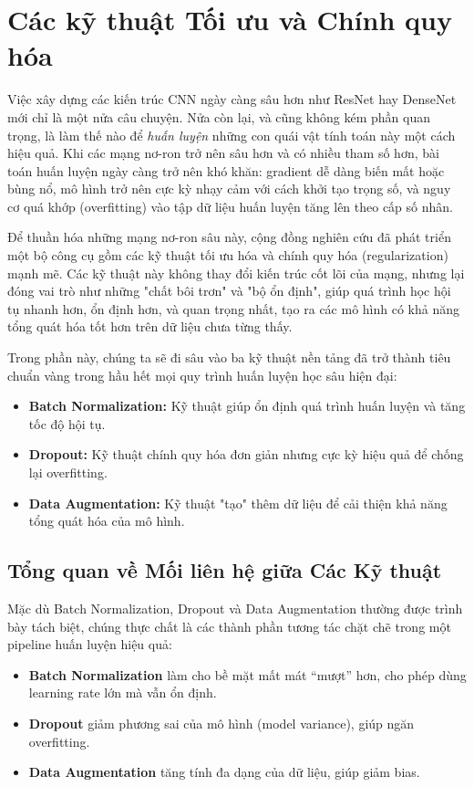 \section{Các kỹ thuật Tối ưu và Chính quy hóa}
\label{sec:optimization_regularization_techniques}

Việc xây dựng các kiến trúc CNN ngày càng sâu hơn như ResNet hay DenseNet mới chỉ là một nửa câu chuyện. Nửa còn lại, và cũng không kém phần quan trọng, là làm thế nào để \textit{huấn luyện} những con quái vật tính toán này một cách hiệu quả. Khi các mạng nơ-ron trở nên sâu hơn và có nhiều tham số hơn, bài toán huấn luyện ngày càng trở nên khó khăn: gradient dễ dàng biến mất hoặc bùng nổ, mô hình trở nên cực kỳ nhạy cảm với cách khởi tạo trọng số, và nguy cơ quá khớp (overfitting) vào tập dữ liệu huấn luyện tăng lên theo cấp số nhân.

Để thuần hóa những mạng nơ-ron sâu này, cộng đồng nghiên cứu đã phát triển một bộ công cụ gồm các kỹ thuật tối ưu hóa và chính quy hóa (regularization) mạnh mẽ. Các kỹ thuật này không thay đổi kiến trúc cốt lõi của mạng, nhưng lại đóng vai trò như những "chất bôi trơn" và "bộ ổn định", giúp quá trình học hội tụ nhanh hơn, ổn định hơn, và quan trọng nhất, tạo ra các mô hình có khả năng tổng quát hóa tốt hơn trên dữ liệu chưa từng thấy.

Trong phần này, chúng ta sẽ đi sâu vào ba kỹ thuật nền tảng đã trở thành tiêu chuẩn vàng trong hầu hết mọi quy trình huấn luyện học sâu hiện đại:
\begin{itemize}
	\item \textbf{Batch Normalization:} Kỹ thuật giúp ổn định quá trình huấn luyện và tăng tốc độ hội tụ.
	\item \textbf{Dropout:} Kỹ thuật chính quy hóa đơn giản nhưng cực kỳ hiệu quả để chống lại overfitting.
	\item \textbf{Data Augmentation:} Kỹ thuật "tạo" thêm dữ liệu để cải thiện khả năng tổng quát hóa của mô hình.
\end{itemize}

\subsection{Tổng quan về Mối liên hệ giữa Các Kỹ thuật}
Mặc dù Batch Normalization, Dropout và Data Augmentation thường được trình bày tách biệt, 
chúng thực chất là các thành phần tương tác chặt chẽ trong một pipeline huấn luyện hiệu quả:

\begin{itemize}
	\item \textbf{Batch Normalization} làm cho bề mặt mất mát “mượt” hơn, cho phép dùng learning rate lớn mà vẫn ổn định.
	\item \textbf{Dropout} giảm phương sai của mô hình (model variance), giúp ngăn overfitting.
	\item \textbf{Data Augmentation} tăng tính đa dạng của dữ liệu, giúp giảm bias.
\end{itemize}

